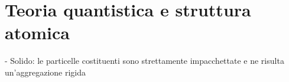 \section{Teoria quantistica e struttura atomica}
- Solido: le particelle costituenti sono strettamente impacchettate e ne risulta un'aggregazione rigida
